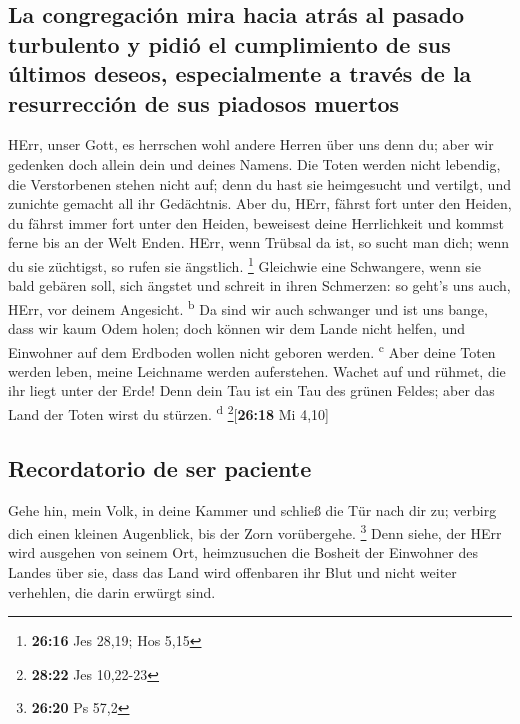 \hypertarget{la-congregaciuxf3n-mira-hacia-atruxe1s-al-pasado-turbulento-y-pidiuxf3-el-cumplimiento-de-sus-uxfaltimos-deseos-especialmente-a-travuxe9s-de-la-resurrecciuxf3n-de-sus-piadosos-muertos}{%
\subsection{La congregación mira hacia atrás al pasado turbulento y
pidió el cumplimiento de sus últimos deseos, especialmente a través de
la resurrección de sus piadosos
muertos}\label{la-congregaciuxf3n-mira-hacia-atruxe1s-al-pasado-turbulento-y-pidiuxf3-el-cumplimiento-de-sus-uxfaltimos-deseos-especialmente-a-travuxe9s-de-la-resurrecciuxf3n-de-sus-piadosos-muertos}}

 HErr, unser Gott, es herrschen wohl andere Herren über
uns denn du; aber wir gedenken doch allein dein und deines Namens.
 Die Toten werden nicht lebendig, die Verstorbenen stehen
nicht auf; denn du hast sie heimgesucht und vertilgt, und zunichte
gemacht all ihr Gedächtnis.  Aber du, HErr, fährst fort
unter den Heiden, du fährst immer fort unter den Heiden, beweisest deine
Herrlichkeit und kommst ferne bis an der Welt Enden. 
HErr, wenn Trübsal da ist, so sucht man dich; wenn du sie züchtigst, so
rufen sie ängstlich. \footnote{\textbf{26:16} Jes 28,19; Hos 5,15}
 Gleichwie eine Schwangere, wenn sie bald gebären soll,
sich ängstet und schreit in ihren Schmerzen: so geht's uns auch, HErr,
vor deinem Angesicht. \textsuperscript{b}  Da sind wir
auch schwanger und ist uns bange, dass wir kaum Odem holen; doch können
wir dem Lande nicht helfen, und Einwohner auf dem Erdboden wollen nicht
geboren werden. \textsuperscript{c}  Aber deine Toten
werden leben, meine Leichname werden auferstehen. Wachet auf und rühmet,
die ihr liegt unter der Erde! Denn dein Tau ist ein Tau des grünen
Feldes; aber das Land der Toten wirst du stürzen. \textsuperscript{d}
\footnote{\textbf{28:22} Jes 10,22-23}{[}\textbf{26:18} Mi 4,10{]}

\hypertarget{recordatorio-de-ser-paciente}{%
\subsection{Recordatorio de ser
paciente}\label{recordatorio-de-ser-paciente}}

 Gehe hin, mein Volk, in deine Kammer und schließ die Tür
nach dir zu; verbirg dich einen kleinen Augenblick, bis der Zorn
vorübergehe. \footnote{\textbf{26:20} Ps 57,2}  Denn
siehe, der HErr wird ausgehen von seinem Ort, heimzusuchen die Bosheit
der Einwohner des Landes über sie, dass das Land wird offenbaren ihr
Blut und nicht weiter verhehlen, die darin erwürgt sind.

